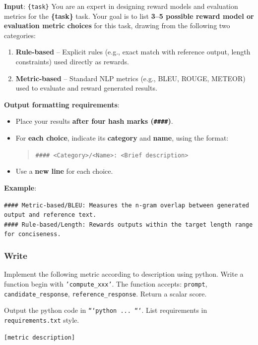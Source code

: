 \begin{tcolorbox}[promptbox, title={LIST\_TASK\_PROMPT}]
\textbf{Input}: \texttt{\{task\}}
\tcblower
You are an expert in designing reward models and evaluation metrics for the \textbf{\{task\}} task.  
Your goal is to list \textbf{3–5 possible reward model or evaluation metric choices} for this task, drawing from the following two categories:  

\begin{enumerate}
    \item \textbf{Rule-based} – Explicit rules (e.g., exact match with reference output, length constraints) used directly as rewards.  
    \item \textbf{Metric-based} – Standard NLP metrics (e.g., BLEU, ROUGE, METEOR) used to evaluate and reward generated results.  
\end{enumerate}

\textbf{Output formatting requirements}:  
\begin{itemize}
    \item Place your results \textbf{after four hash marks (\texttt{\#\#\#\#})}.
    \item For \textbf{each choice}, indicate its \textbf{category} and \textbf{name}, using the format:
    \begin{quote}
        \texttt{\#\#\#\# <Category>/<Name>: <Brief description>}
    \end{quote}
    \item Use a \textbf{new line} for each choice.
\end{itemize}

\textbf{Example}:  
\begin{tcolorbox}[colback=white, colframe=gray!30, size=small]
\texttt{\#\#\#\# Metric-based/BLEU: Measures the n-gram overlap between generated output and reference text.}\\
\texttt{\#\#\#\# Rule-based/Length: Rewards outputs within the target length range for conciseness.}
\end{tcolorbox}
\end{tcolorbox}




\subsubsection{Write} \label{sec:code-agent-write}

\begin{tcolorbox}[title={\texttt{WRITE\_CODE\_PROPMT}}, breakable, colframe=blue!50!black, colback=blue!5]
Implement the following metric according to description using python. Write a function begin with \texttt{'compute\_xxx'}. The function accepts: \texttt{prompt}, \texttt{candidate\_response}, \texttt{reference\_response}. Return a scalar score.

Output the python code in \texttt{```python ... ```}. List requirements in \texttt{requirements.txt} style.

\medskip
\texttt{[metric description]}
\end{tcolorbox}




